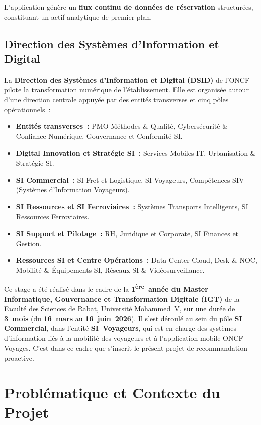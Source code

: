 \documentclass[12pt, a4paper]{report}
\begin{document}
L'application génère un \textbf{flux continu de données de réservation}
structurées, constituant un actif analytique de premier plan.

\subsection{Direction des Systèmes d'Information et Digital}

La \textbf{Direction des Systèmes d'Information et Digital (DSID)} de l'ONCF
pilote la transformation numérique de l'établissement. Elle est organisée autour
d'une direction centrale appuyée par des entités transverses et cinq pôles
opérationnels~:

\begin{itemize}
\item \textbf{Entités transverses~:} PMO Méthodes \& Qualité, Cybersécurité \&
    Confiance Numérique, Gouvernance et Conformité SI.
\item \textbf{Digital Innovation et Stratégie SI~:} Services Mobiles IT,
    Urbanisation \& Stratégie SI.
\item \textbf{SI Commercial~:} SI Fret et Logistique, SI Voyageurs,
    Compétences SIV (Systèmes d'Information Voyageurs).
\item \textbf{SI Ressources et SI Ferroviaires~:} Systèmes Transports
    Intelligents, SI Ressources Ferroviaires.
\item \textbf{SI Support et Pilotage~:} RH, Juridique et Corporate,
    SI Finances et Gestion.
\item \textbf{Ressources SI et Centre Opérations~:} Data Center Cloud,
    Desk \& NOC, Mobilité \& Équipements SI, Réseaux SI \& Vidéosurveillance.
\end{itemize}

Ce stage a été réalisé dans le cadre de la \textbf{1\textsuperscript{ère}~année
du Master Informatique, Gouvernance et Transformation Digitale (IGT)} de la
Faculté des Sciences de Rabat, Université Mohammed~V, sur une durée de
\textbf{3~mois} (du \textbf{16~mars} au \textbf{16~juin~2026}). Il s'est
déroulé au sein du pôle \textbf{SI Commercial}, dans l'entité
\textbf{SI~Voyageurs}, qui est en charge des systèmes d'information liés à
la mobilité des voyageurs et à l'application mobile ONCF Voyages. C'est dans
ce cadre que s'inscrit le présent projet de recommandation proactive.

\section{Problématique et Contexte du Projet}
\end{document}
